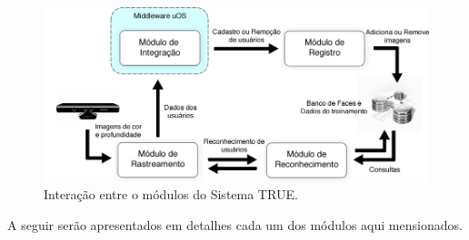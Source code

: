 	\begin{figure}[htb]
			\begin{center}
				\includegraphics[scale=0.5]{figuras/4.ProblemaEProposta/modulo-integracao.png}
			\end{center}
			\caption{Interação entre o módulos do Sistema TRUE.}
			\label{fig:relacao-modulos}
		\end{figure}

A seguir serão apresentados em detalhes cada um dos módulos aqui mensionados.








